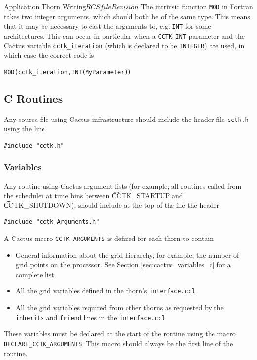 \begin{cactuspart}{Application Thorn Writing}{$RCSfile$}{$Revision$}
The intrinsic function \texttt{MOD} in Fortran takes two integer
arguments, which should both be of the same type. This means
that it may be necessary to cast the arguments to, e.g.
\texttt{INT} for some architectures. This can occur in particular
when a \texttt{CCTK\_INT} parameter and the Cactus variable \texttt{cctk\_iteration}
(which is declared to be \texttt{INTEGER}) are used,
in which case the correct code is
\begin{verbatim}
MOD(cctk_iteration,INT(MyParameter))
\end{verbatim}


\subsection{C Routines}

Any source file using Cactus infrastructure should include
the header file \texttt{cctk.h} using the line
\begin{verbatim}
#include "cctk.h"
\end{verbatim}

\subsubsection{Variables}

Any routine using Cactus argument lists (for example, all routines called from
the scheduler at time bins between {\t CCTK\_STARTUP} and {\t CCTK\_SHUTDOWN}),
should include at the top of the file the header
\begin{verbatim}
#include "cctk_Arguments.h"
\end{verbatim}

A Cactus macro \texttt{CCTK\_ARGUMENTS} is defined for each thorn
to contain
\begin{itemize}
\item General information about the grid hierarchy, for example, the
number of grid points on the processor. See Section \ref{sec:cactus_variables_c}
for a complete list.
\item All the grid variables defined in the thorn's \texttt{interface.ccl}
\item All the grid variables required from other thorns as requested by
      the \texttt{inherits} and \texttt{friend} lines in the \texttt{interface.ccl}
\end{itemize}
These variables must be declared at the start of the routine using
the macro \texttt{DECLARE\_CCTK\_ARGUMENTS}. This macro should always be the
first line of the routine.


\end{cactuspart}
